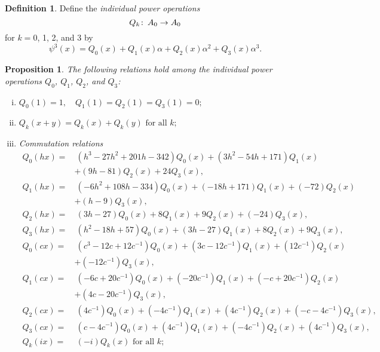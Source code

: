 \documentclass{gtpart}
\newtheorem{prop}[thm]{Proposition}
\theoremstyle{definition}
\newtheorem{defn}[thm]{Definition}
\theoremstyle{remark}
\def\co{\colon\thinspace}
\newcommand{\A}{\alpha}
\newcommand{\p}{\psi^3}
\begin{document}
\begin{defn}
 Define the {\em individual power operations} 
 \[
  Q_k \co A_0 \to A_0 
 \]
 for $k = 0$, 1, 2, and 3 by 
 \begin{equation}
 \label{Q_k}
  \p (x) = Q_0(x) + Q_1(x) \A + Q_2(x) \A^2 + Q_3(x) \A^3.  
 \end{equation}
\end{defn}

\begin{prop}
\label{prop:Q}
 The following relations hold among the individual power operations $Q_0$, $Q_1$, $Q_2$, and $Q_3$: 
 \begin{enumerate}[(i)]
  \item $Q_0(1) = 1, \quad Q_1(1) = Q_2(1) = Q_3(1) = 0;$ \label{Q(i)}

  \item $Q_k(x+y) = Q_k(x) + Q_k(y) \text{~for all~} k;$ \label{Q(ii)}

  \item {\em Commutation relations} \label{Q(iii)}
  \begin{equation*}
  \begin{split}
   Q_0(h x) = & ~ (h^3 - 27 h^2 + 201 h - 342) Q_0(x) + (3 h^2 - 54 h + 171) Q_1(x) \qquad \qquad \\
              & + (9 h - 81) Q_2(x) + 24 Q_3(x), \\
   Q_1(h x) = & ~ (-6 h^2 + 108 h - 334) Q_0(x) + (-18 h + 171) Q_1(x) + (-72) Q_2(x) \\
              & + (h - 9) Q_3(x), \\
   Q_2(h x) = & ~ (3 h - 27) Q_0(x) + 8 Q_1(x) + 9 Q_2(x) + (-24) Q_3(x), \\
   Q_3(h x) = & ~ (h^2 - 18 h + 57) Q_0(x) + (3 h - 27) Q_1(x) + 8 Q_2(x) + 9 Q_3(x), \\
   Q_0(c x) = & ~ (c^3 - 12 c + 12 c^{-1}) Q_0(x) + (3 c - 12 c^{-1}) Q_1(x) + (12 c^{-1}) Q_2(x) \\
              & + (-12 c^{-1}) Q_3(x), \\
   Q_1(c x) = & ~ (-6 c + 20 c^{-1}) Q_0(x) + (-20 c^{-1}) Q_1(x) + (- c + 20 c^{-1}) Q_2(x) \\
              & + (4 c - 20 c^{-1}) Q_3(x), \\
   Q_2(c x) = & ~ (4 c^{-1}) Q_0(x) + (-4 c^{-1}) Q_1(x) + (4 c^{-1}) Q_2(x) + (- c - 4 c^{-1}) Q_3(x), \\
   Q_3(c x) = & ~ (c - 4 c^{-1}) Q_0(x) + (4 c^{-1}) Q_1(x) + (-4 c^{-1}) Q_2(x) + (4 c^{-1}) Q_3(x), \\
   Q_k(i x) = & ~ (-i) Q_k(x) \text{~for all~} k; \\
  \end{split}
  \end{equation*}


\end{enumerate}
\end{prop}
\end{document}
